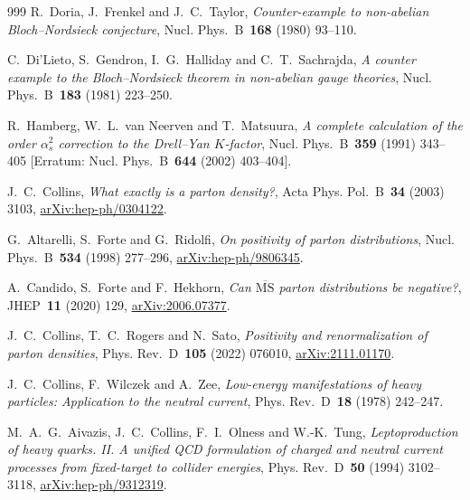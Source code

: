 \begin{thebibliography}{999}
R.~Doria, J.~Frenkel and J.~C.~Taylor, \emph{Counter-example to non-abelian Bloch--Nordsieck conjecture}, Nucl. Phys.~B~\textbf{168} (1980) \mbox{93--110}.

C.~Di'Lieto, S.~Gendron, I.~G.~Halliday and C.~T.~Sachrajda, \emph{A counter example to the Bloch--Nordsieck theorem in non-abelian gauge theories}, Nucl. Phys.~B~\textbf{183} (1981) \mbox{223--250}.

R.~Hamberg, W.~L.~van Neerven and T.~Matsuura, \emph{A complete calculation of the order $\alpha_s^2$ correction to the Drell--Yan $K$-factor}, Nucl. Phys.~B~\textbf{359} (1991) \mbox{343--405} [Erratum: Nucl. Phys.~B~\textbf{644} (2002) \mbox{403--404}].

J.~C.~Collins, \emph{What exactly is a parton density?}, Acta Phys. Pol.~B~\textbf{34} (2003) \mbox{3103}, \href{https://arxiv.org/abs/hep-ph/0304122}{arXiv:hep-ph/0304122}.

G.~Altarelli, S.~Forte and G.~Ridolfi, \emph{On positivity of parton distributions}, Nucl. Phys.~B~\textbf{534} (1998) \mbox{277--296}, \href{https://arxiv.org/abs/hep-ph/9806345}{arXiv:hep-ph/9806345}.

A.~Candido, S.~Forte and F.~Hekhorn, \emph{Can $\overline{\mathrm{MS}}$ parton distributions be negative?}, JHEP~\textbf{11} (2020) \mbox{129}, \href{https://arxiv.org/abs/2006.07377}{arXiv:2006.07377}.

J.~C.~Collins, T.~C.~Rogers and N.~Sato, \emph{Positivity and renormalization of parton densities}, Phys. Rev.~D~\textbf{105} (2022) \mbox{076010}, \href{https://arxiv.org/abs/2111.01170}{arXiv:2111.01170}.

J.~C.~Collins, F.~Wilczek and A.~Zee, \emph{Low-energy manifestations of heavy particles: Application to the neutral current}, Phys. Rev.~D~\textbf{18} (1978) \mbox{242--247}.

M.~A.~G.~Aivazis, J.~C.~Collins, F.~I.~Olness and W.-K.~Tung, \emph{Leptoproduction of heavy quarks. II. A unified QCD formulation of charged and neutral current processes from fixed-target to collider energies}, Phys. Rev.~D~\textbf{50} (1994) \mbox{3102--3118}, \href{https://arxiv.org/abs/hep-ph/9312319}{arXiv:hep-ph/9312319}.


\end{thebibliography}
